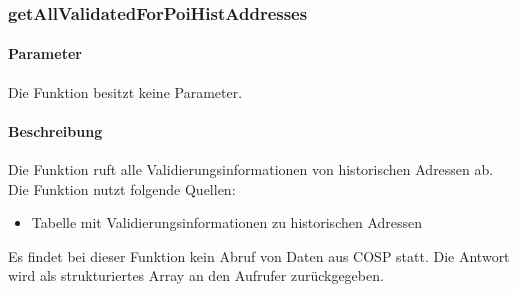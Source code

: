 \subsubsection{getAllValidatedForPoiHistAddresses}
\paragraph{Parameter} Die Funktion besitzt keine Parameter.
\paragraph{Beschreibung} Die Funktion ruft alle Validierungsinformationen von historischen Adressen ab. Die Funktion nutzt folgende Quellen:
\begin{itemize}
	\item Tabelle mit Validierungsinformationen zu historischen Adressen
\end{itemize}
Es findet bei dieser Funktion kein Abruf von Daten aus {\glqq COSP\grqq} statt. Die Antwort wird als strukturiertes Array an den Aufrufer zurückgegeben.
